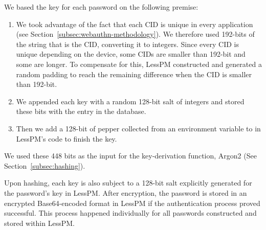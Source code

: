 We based the key for each password on the following premise:
\begin{enumerate}
  \item
  We took advantage of the fact that each CID is unique in every application
  (see Section~\ref{subsec:webauthn-methodology}).
  We therefore used 192-bits of the string that is the CID\@, converting it to
  integers.
  Since every CID is unique depending on the device, some CIDs are smaller
  than 192-bit and some are longer.
  To compensate for this, LessPM constructed and generated a random padding
  to reach the remaining difference when the CID is smaller than 192-bit.
  \item
  We appended each key with a random 128-bit salt of integers and stored these
  bits with the entry in the database.
  \item
  Then we add a 128-bit of pepper collected from an environment variable to
  in LessPM's code to finish the key.
\end{enumerate}
We used these 448 bits as the input for the key-derivation function,
Argon2 (See Section~\ref{subsec:hashing}).

Upon hashing, each key is also subject to a 128-bit salt explicitly generated
for the password's key in LessPM\@.
After encryption, the password is stored in an encrypted Base64-encoded
format in LessPM if the authentication process proved successful.
This process happened individually for all passwords constructed and stored
within LessPM\@.

